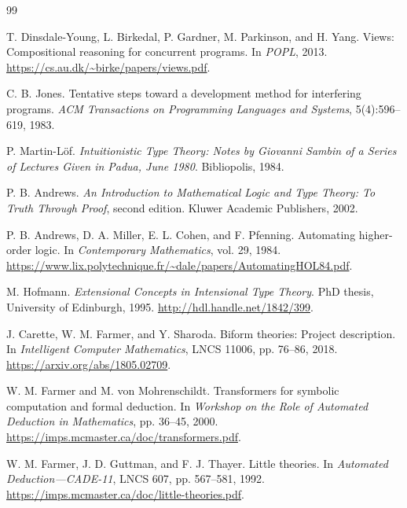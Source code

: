 \documentclass[11pt]{article}
\theoremstyle{definition}
\theoremstyle{remark}
\begin{document}
\begin{thebibliography}{99}
\raggedright

T. Dinsdale-Young, L. Birkedal, P. Gardner, M. Parkinson, and H. Yang.
\newblock Views: Compositional reasoning for concurrent programs.
\newblock In \emph{POPL}, 2013.
\newblock \url{https://cs.au.dk/~birke/papers/views.pdf}.

C. B. Jones.
\newblock Tentative steps toward a development method for interfering programs.
\newblock \emph{ACM Transactions on Programming Languages and Systems},
  5(4):596--619, 1983.

P. Martin-L\"of.
\newblock \emph{Intuitionistic Type Theory: Notes by Giovanni Sambin of a
  Series of Lectures Given in Padua, June 1980}.
\newblock Bibliopolis, 1984.

P. B. Andrews.
\newblock \emph{An Introduction to Mathematical Logic and Type Theory: To
  Truth Through Proof}, second edition.
\newblock Kluwer Academic Publishers, 2002.

P. B. Andrews, D. A. Miller, E. L. Cohen, and F. Pfenning.
\newblock Automating higher-order logic.
\newblock In \emph{Contemporary Mathematics}, vol. 29, 1984.
\newblock \url{https://www.lix.polytechnique.fr/~dale/papers/AutomatingHOL84.pdf}.

M. Hofmann.
\newblock \emph{Extensional Concepts in Intensional Type Theory}.
\newblock PhD thesis, University of Edinburgh, 1995.
\newblock \url{http://hdl.handle.net/1842/399}.

J. Carette, W. M. Farmer, and Y. Sharoda.
\newblock Biform theories: Project description.
\newblock In \emph{Intelligent Computer Mathematics}, LNCS 11006,
  pp. 76--86, 2018.
\newblock \url{https://arxiv.org/abs/1805.02709}.

W. M. Farmer and M. von Mohrenschildt.
\newblock Transformers for symbolic computation and formal deduction.
\newblock In \emph{Workshop on the Role of Automated Deduction in
  Mathematics}, pp. 36--45, 2000.
\newblock \url{https://imps.mcmaster.ca/doc/transformers.pdf}.

W. M. Farmer, J. D. Guttman, and F. J. Thayer.
\newblock Little theories.
\newblock In \emph{Automated Deduction---CADE-11}, LNCS 607,
  pp. 567--581, 1992.
\newblock \url{https://imps.mcmaster.ca/doc/little-theories.pdf}.


\end{thebibliography}
\end{document}
